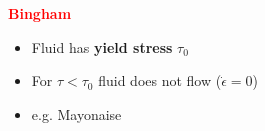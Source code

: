 \documentclass{beamer}
\begin{document}
\begin{frame}
\begin{columns}[t]
\begin{column}{0.45\paperwidth}
      \textbf{\textcolor{red}{Bingham}}
      \begin{itemize}
      \item Fluid has \textbf{yield stress} $\tau_{0}$ \\
      \item For $\tau < \tau_{0}$ fluid does not flow ($\dot{\epsilon} = 0$) \\
      \item e.g. Mayonaise
      \end{itemize}
      
\end{column}

  \end{columns}

\end{frame}
\end{document}
